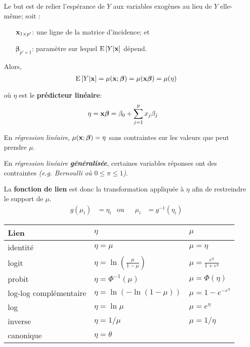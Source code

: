 \documentclass[10pt, french]{article}
\begin{document}
\begin{multicols*}{3}
Le but est de relier l'espérance de $Y$ aux variables exogènes au lieu de $Y$ elle-même; soit :
\begin{enumerate}
	\item[$\mathbf{x}_{1 \times p'}$: ] une ligne de la matrice d'incidence; et
	\item[$\bm{\beta}_{p' \times 1}$: ] paramètre sur lequel $\mathrm{E} \left[ Y | \mathbf{x} \right]$ dépend.
\end{enumerate}

Alors, 
\begin{align*}
	\mathrm{E} \left[ Y | \mathbf{x} \right] 
		= \mu(\mathbf{x}; \bm{\beta}) 
		= \mu(\mathbf{x}\bm{\beta}) 
		= \mu(\eta)
\end{align*}

où $\eta$ est le \textbf{prédicteur linéaire}: 
\begin{align*}
	\eta 
		&=	\mathbf{x} \boldsymbol{\beta}	
		=	\beta_0 + \sum_{j = 1}^{p} x_{j} \beta_{j}	
\end{align*}

En \textit{régression linéaire}, $\mu(\mathbf{x}; \bm{\beta}) = \eta$ sans contraintes sur les valeurs que peut prendre $\mu$.

En \textit{régression linéaire \textbf{généralisée}}, certaines variables réponses ont des contraintes \textit{(e.g.  Bernoulli où $0 \leq \pi \leq 1$)}.

La \textbf{fonction de lien} est donc la transformation appliquée à $\eta$ afin de restreindre le support de $\mu$.
\begin{align*}
	g(\mu_i) 
		&= \eta_i	&	\text{ou} & 
	&\mu_i
		&= g^{-1}(\eta_i)
\end{align*}

\begin{center}
\begin{tabular}{| p{2cm} | l l |}
\hline
	\textbf{Lien}			&	$\eta$ &	$\mu$	\\\hline
	identité		&	$\eta = \mu$	 &	$\mu = \eta$	  	\\
	logit	&	$\eta = \ln \left( \frac{\mu}{1 - \mu} \right)$	&	$\mu = \frac{e^{\eta}}{1 + e^{\eta}}$	\\
	probit		&	$\eta = \Phi^{-1}(\mu)$	&	$\mu = \Phi(\eta)$	\\
	log-log complémentaire &	$\eta = \ln ( - \ln (1 - \mu))$	&	$\mu = 1 - e^{-e^{\eta}}$	\\
	log			&	$\eta = \ln \mu$	&	$\mu = e^{\eta}$	\\
	inverse			&	$\eta = 1/\mu$	&	$\mu = 1/\eta$	\\
	canonique	&	$\eta = \theta$	&	 	\\
\hline
\end{tabular}
\end{center}


\end{multicols*}
\end{document}

